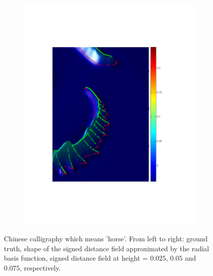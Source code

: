 \documentclass[annual]{acmsiggraph}
\begin{document}
\begin{figure}
\begin{subfigure}[b]{0.25\linewidth}
                \includegraphics[width=\textwidth]{images/seahorse/3.pdf}
        \end{subfigure}
        \caption{Chinese calligraphy which means 'horse'. From left to right: ground truth, shape of the signed distance field approximated by the radial basis function, signed distance field at height = $0.025$, $0.05$ and $0.075$, respectively. }
				\label{fig:horse}
\end{figure}
\end{document}
